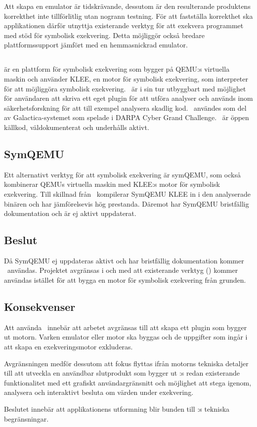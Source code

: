 Att skapa en emulator är tidskrävande, dessutom är den resulterande produktens
korrekthet inte tillförlitlig utan nogrann testning. För att fastställa
korrekthet ska applikationen därför utnyttja existerande verktyg för att
exekvera programmet med stöd för symbolisk exekvering. Detta möjliggör också
bredare plattformssupport jämfört med en hemmasnickrad emulator.

\subsection{\stoe}

\stoe\cite{s2e} är en plattform för symbolisk exekvering som bygger på QEMU:s
virtuella maskin och använder KLEE\cite{klee}, en motor för symbolisk
exekvering, som interpreter för att möjliggöra symbolisk exekvering. \stoe\ är i
sin tur utbyggbart med möjlighet för användaren att skriva ett eget plugin för
att utföra analyser och används inom säkerhetsforskning för att till exempel
analysera skadlig kod. \stoe\ användes som del av Galactica-systemet som spelade
i DARPA Cyber Grand Challenge\cite{s2e_website}. \stoe\ är öppen källkod,
väldokumenterat och underhålls aktivt.

\subsection{SymQEMU}

Ett alternativt verktyg för att symbolisk exekvering är symQEMU\cite{symqemu},
som också kombinerar QEMUs virtuella maskin med KLEE:s motor för symbolisk
exekvering. Till skillnad från \stoe\ kompilerar SymQEMU KLEE in i den
analyserade binären och har jämförelsevis hög prestanda. Däremot har SymQEMU
bristfällig dokumentation och är ej aktivt uppdaterat.

\subsection{Beslut}

Då SymQEMU ej uppdateras aktivt och har bristfällig dokumentation kommer \stoe\
användas. Projektet avgränsas i och med att existerande verktyg (\stoe) kommer
användas istället för att bygga en motor för symbolisk exekvering från grunden.

\subsection{Konsekvenser}

Att använda \stoe\ innebär att arbetet avgränsas till att skapa ett plugin som
bygger ut motorn. Varken emulator eller motor ska byggas och de uppgifter som
ingår i att skapa en exekveringsmotor exkluderas.

Avgränsningen medför dessutom att fokus flyttas ifrån motorns tekniska detaljer
till att utveckla en användbar slutprodukt som bygger ut \stoe:s redan
existerande funktionalitet med ett grafiskt användargränsnitt och möjlighet att
stega igenom, analysera och interaktivt besluta om värden under exekvering.

Beslutet innebär att applikationens utformning blir bunden till \stoe:s tekniska
begränsningar.
